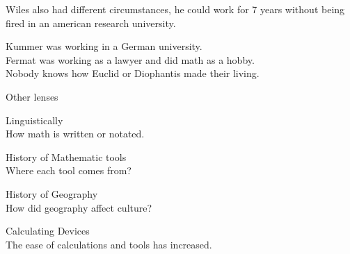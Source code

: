 \documentclass{report}
\begin{document}
\begin{description}
\begin{itemize}
\begin{mdframed}
                    \vspace{10pt}

                    Wiles also had different circumstances,
                    he could work for 7 years without being
                    fired in an american research university.
                \end{mdframed}
                \begin{mdframed}
                    Kummer was working in a German university.\\
                    Fermat was working as a lawyer and did math
                    as a hobby.\\
                    Nobody knows how Euclid or Diophantis made
                    their living.
                \end{mdframed}
        \end{itemize}

    \item Other lenses
        \begin{description}
            \item Linguistically\\
                How math is written or notated.
            \item History of Mathematic tools\\
                Where each tool comes from?
            \item History of Geography\\
                How did geography affect culture?
            \item Calculating Devices\\
                The ease of calculations and tools has increased.
        \end{description}
\end{description}
\end{document}
